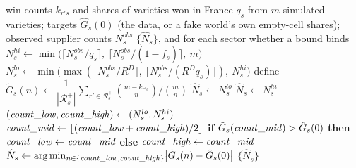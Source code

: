 \begin{algorithm}[H]
\caption{\textsc{CalibrateVarietyCount}: variety count by monotone integer search}
\label{alg:countN}
\small
\begin{algorithmic}[1]
\Require win counts $k_{r's}$ and shares of varieties won in France $q_s$ from $m$ simulated varieties; targets
  $\hat{G}_s(0)$ (the data, or a fake world's own empty-cell shares); observed supplier counts $N^{obs}_s$
\Ensure $\{\hat{N}_s\}$, and for each sector whether a bound binds
    \State $N^{hi}_s\gets\min\bigl(\lceil N^{obs}_s/q_s\rceil,\ \lceil N^{obs}_s/(1-\hat f_s)\rceil,\ m\bigr)$
    \State $N^{lo}_s\gets\min\bigl(\max(\lceil N^{obs}_s/R^D\rceil,\ \lceil N^{obs}_s/(R^Dq_s)\rceil),\ N^{hi}_s\bigr)$
    \State define
      $\tilde{G}_s(n)\gets\dfrac{1}{|\mathcal{R}^+_s|}\displaystyle\sum_{r'\in\mathcal{R}^+_s}
      \binom{m-k_{r's}}{n}\Big/\binom{m}{n}$
        \State $\hat{N}_s\gets N^{lo}_s$
        \State $\hat{N}_s\gets N^{hi}_s$
    \Else
        \State $(\mathit{count\_low},\mathit{count\_high})\gets(N^{lo}_s,N^{hi}_s)$
            \State $\mathit{count\_mid}\gets\lfloor(\mathit{count\_low}+\mathit{count\_high})/2\rfloor$
            \State \textbf{if} $\tilde{G}_s(\mathit{count\_mid})>\hat{G}_s(0)$ \textbf{then}
              $\mathit{count\_low}\gets \mathit{count\_mid}$ \textbf{else} $\mathit{count\_high}\gets \mathit{count\_mid}$
        \EndWhile
        \State $\hat{N}_s\gets\arg\min_{n\in\{\mathit{count\_low},\mathit{count\_high}\}}
          \bigl|\tilde{G}_s(n)-\hat{G}_s(0)\bigr|$
    \EndIf
\EndFor
\State \Return $\{\hat{N}_s\}$
\end{algorithmic}
\end{algorithm}

